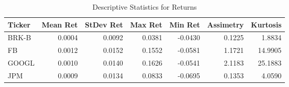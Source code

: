 \begin{table}[ht]
\centering
\begin{tabular}{lrrrrrr}
  \hline
Ticker & Mean Ret & StDev Ret & Max Ret & Min Ret & Assimetry & Kurtosis \\ 
  \hline
BRK-B & 0.0004 & 0.0092 & 0.0381 & -0.0430 & 0.1225 & 1.8834 \\ 
  FB & 0.0012 & 0.0152 & 0.1552 & -0.0581 & 1.1721 & 14.9905 \\ 
  GOOGL & 0.0010 & 0.0140 & 0.1626 & -0.0541 & 2.1183 & 25.1883 \\ 
  JPM & 0.0009 & 0.0134 & 0.0833 & -0.0695 & 0.1353 & 4.0590 \\ 
   \hline
\end{tabular}
\caption{Descriptive Statistics for Returns} 
\label{tab:DescRetStats}
\end{table}
